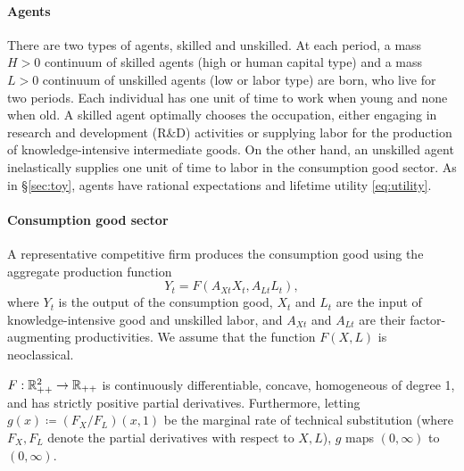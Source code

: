 \documentclass[a4paper,12pt]{article}
\numberwithin{equation}{section}
\theoremstyle{plain}
\begin{document}
\paragraph{Agents}

There are two types of agents, skilled and unskilled. At each period, a mass $H>0$ continuum of skilled agents (high or human capital type) and a mass $L>0$ continuum of unskilled agents (low or labor type) are born, who live for two periods. Each individual has one unit of time to work when young and none when old. A skilled agent optimally chooses the occupation, either engaging in research and development (R\&D) activities or supplying labor for the production of knowledge-intensive intermediate goods. On the other hand, an unskilled agent inelastically supplies one unit of time to labor in the consumption good sector. As in \S\ref{sec:toy}, agents have rational expectations and lifetime utility \eqref{eq:utility}.

\paragraph{Consumption good sector}

A representative competitive firm produces the consumption good using the aggregate production function
\begin{equation}
    Y_t = F(A_{Xt}X_t,A_{Lt}L_t),    \label{eq:prod_Y}
\end{equation}
where $Y_t$ is the output of the consumption good, $X_t$ and $L_t$ are the input of knowledge-intensive good and unskilled labor, and $A_{Xt}$ and $A_{Lt}$ are their factor-augmenting productivities. We assume that the function $F(X,L)$ is neoclassical.

\begin{asmp}\label{asmp:F}
$F:\mathbb{R}_{++}^2\to \mathbb{R}_{++}$ is continuously differentiable, concave, homogeneous of degree 1, and has strictly positive partial derivatives. Furthermore, letting $g(x)\coloneqq (F_X/F_L)(x,1)$ be the marginal rate of technical substitution (where $F_X,F_L$ denote the partial derivatives with respect to $X,L$), $g$ maps $(0,\infty)$ to $(0,\infty)$.
\end{asmp}
\end{document}
